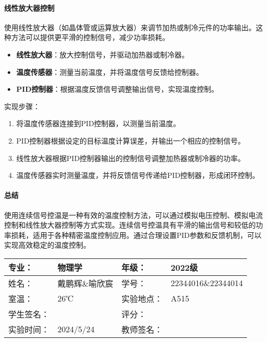 \documentclass[dvipsnames, svgnames,a4paper,11pt]{article}
\begin{document}
\paragraph*{线性放大器控制}

使用线性放大器（如晶体管或运算放大器）来调节加热或制冷元件的功率输出。这种方法可以提供更平滑的控制信号，减少功率损耗。

\begin{itemize}
    \item \textbf{线性放大器}：放大控制信号，并驱动加热器或制冷器。
    \item \textbf{温度传感器}：测量当前温度，并将温度信号反馈给控制器。
    \item \textbf{PID控制器}：根据温度反馈信号调整输出信号，实现温度控制。
\end{itemize}

实现步骤：

\begin{enumerate}
    \item 将温度传感器连接到PID控制器，以测量当前温度。
    \item PID控制器根据设定的目标温度计算误差，并输出一个相应的控制信号。
    \item 线性放大器根据PID控制器输出的控制信号调整加热器或制冷器的功率。
    \item 温度传感器实时测量温度，并将反馈信号传递给PID控制器，形成闭环控制。
\end{enumerate}


\paragraph*{总结}

使用连续信号控温是一种有效的温度控制方法，可以通过模拟电压控制、模拟电流控制和线性放大器控制等方式实现。连续信号控温具有平滑的输出信号和较低的功率损耗，适用于各种精密温度控制应用。通过合理设置PID参数和反馈机制，可以实现高效稳定的温度控制。







\clearpage
\begin{table}
	\renewcommand\arraystretch{1.7}
	\centering
	\begin{tabularx}{\textwidth}{|X|X|X|X|}
	\hline
	专业：& 物理学 &年级：& 2022级 \\
	\hline
	姓名：& 戴鹏辉\&喻欣宸 & 学号：& 22344016\&22344014 \\
	\hline
	室温：& 26℃ & 实验地点： & A515 \\
	\hline
	学生签名：& & 评分： &\\
	\hline
	实验时间：& 2024/5/24 & 教师签名：&\\
	\hline
	\end{tabularx}
\end{table}
\end{document}
